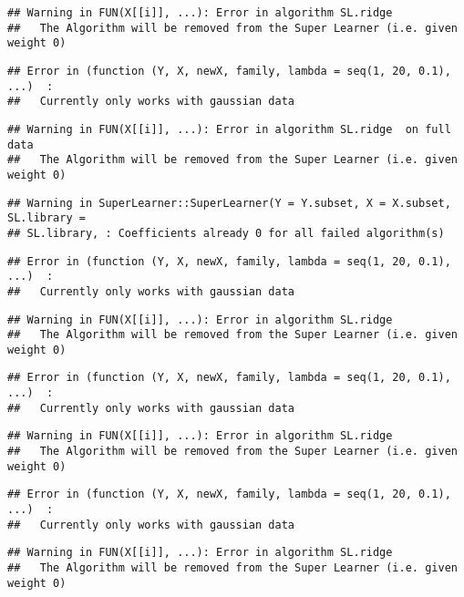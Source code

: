 \documentclass[
]{article}
\begin{document}
\begin{verbatim}
## Warning in FUN(X[[i]], ...): Error in algorithm SL.ridge 
##   The Algorithm will be removed from the Super Learner (i.e. given weight 0)
\end{verbatim}

\begin{verbatim}
## Error in (function (Y, X, newX, family, lambda = seq(1, 20, 0.1), ...)  : 
##   Currently only works with gaussian data
\end{verbatim}

\begin{verbatim}
## Warning in FUN(X[[i]], ...): Error in algorithm SL.ridge  on full data 
##   The Algorithm will be removed from the Super Learner (i.e. given weight 0)
\end{verbatim}

\begin{verbatim}
## Warning in SuperLearner::SuperLearner(Y = Y.subset, X = X.subset, SL.library =
## SL.library, : Coefficients already 0 for all failed algorithm(s)
\end{verbatim}

\begin{verbatim}
## Error in (function (Y, X, newX, family, lambda = seq(1, 20, 0.1), ...)  : 
##   Currently only works with gaussian data
\end{verbatim}

\begin{verbatim}
## Warning in FUN(X[[i]], ...): Error in algorithm SL.ridge 
##   The Algorithm will be removed from the Super Learner (i.e. given weight 0)
\end{verbatim}

\begin{verbatim}
## Error in (function (Y, X, newX, family, lambda = seq(1, 20, 0.1), ...)  : 
##   Currently only works with gaussian data
\end{verbatim}

\begin{verbatim}
## Warning in FUN(X[[i]], ...): Error in algorithm SL.ridge 
##   The Algorithm will be removed from the Super Learner (i.e. given weight 0)
\end{verbatim}

\begin{verbatim}
## Error in (function (Y, X, newX, family, lambda = seq(1, 20, 0.1), ...)  : 
##   Currently only works with gaussian data
\end{verbatim}

\begin{verbatim}
## Warning in FUN(X[[i]], ...): Error in algorithm SL.ridge 
##   The Algorithm will be removed from the Super Learner (i.e. given weight 0)
\end{verbatim}
\end{document}
